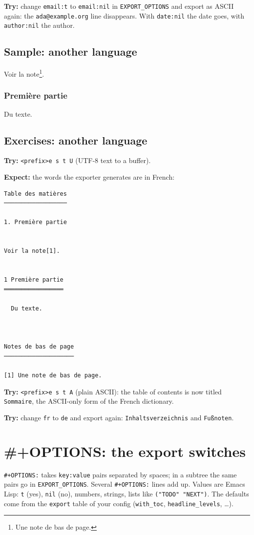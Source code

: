 \textbf{Try:} change \texttt{email:t} to \texttt{email:nil} in \texttt{EXPORT\_OPTIONS} and export as
ASCII again: the \texttt{ada@example.org} line disappears. With \texttt{date:nil} the
date goes, with \texttt{author:nil} the author.
\subsection{Sample: another language}
\label{sec:org5befec0}
Voir la note\footnote{Une note de bas de page.}.
\subsubsection{Première partie}
\label{sec:orgd279195}
Du texte.
\subsection{Exercises: another language}
\label{sec:orgef0656a}
\textbf{Try:} \texttt{<prefix>e s t U} (UTF-8 text to a buffer).

\textbf{Expect:} the words the exporter generates are in French:

\begin{verbatim}
Table des matières
──────────────────

1. Première partie


Voir la note[1].


1 Première partie
═════════════════

  Du texte.



Notes de bas de page
────────────────────

[1] Une note de bas de page.
\end{verbatim}

\textbf{Try:} \texttt{<prefix>e s t A} (plain ASCII): the table of contents is now
titled \texttt{Sommaire}, the ASCII-only form of the French dictionary.

\textbf{Try:} change \texttt{fr} to \texttt{de} and export again: \texttt{Inhaltsverzeichnis} and
\texttt{Fußnoten}.
\section{\#+OPTIONS: the export switches}
\label{sec:org4a7a5fe}
\texttt{\#+OPTIONS:} takes \texttt{key:value} pairs separated by spaces; in a subtree the
same pairs go in \texttt{EXPORT\_OPTIONS}. Several \texttt{\#+OPTIONS:} lines add up. Values
are Emacs Lisp: \texttt{t} (yes), \texttt{nil} (no), numbers, strings, lists like
\texttt{("TODO" "NEXT")}. The defaults come from the \texttt{export} table of your
config (\texttt{with\_toc}, \texttt{headline\_levels}, \ldots{}).

